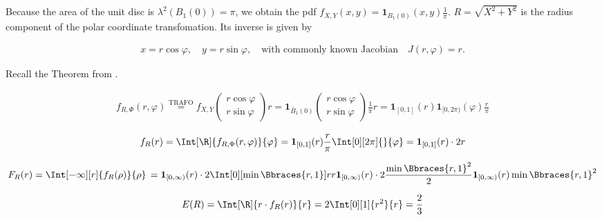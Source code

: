 \begin{solution}

Because the area of the unit disc is $\lambda^2(B_1(0)) = \pi$, we obtain the pdf $f_{X, Y}(x, y) = \mathbf 1_{B_1(0)}(x, y) \frac{1}{\pi}$.
$R = \sqrt{X^2 + Y^2}$ is the radius component of the polar coordinate transfomation.
Its inverse is given by

\begin{align*}
    x = r \cos \varphi,
    \quad
    y = r \sin \varphi,
    \quad
    \text{with commonly known Jacobian}
    \quad
    J(r, \varphi) = r.
\end{align*}

Recall the Theorem from \cite[Lecture 3, Slide 32]{EStat}.

\begin{align*}
    f_{R, \Phi}(r, \varphi)
    \stackrel
    {
        \text{TRAFO}
    }{=}
    f_{X, Y}
    \begin{pmatrix}
        r \cos \varphi \\
        r \sin \varphi
    \end{pmatrix}
    r
    =
    \mathbf 1_{\overline B_1(0)}
    \begin{pmatrix}
        r \cos \varphi \\
        r \sin \varphi
    \end{pmatrix}
    \frac{1}{\pi}
    r
    =
    \mathbf 1_{[0, 1]}(r)
    \mathbf 1_{[0, 2 \pi)}(\varphi)
    \frac{r}{\pi}
\end{align*}

\begin{align*}
    f_R(r)
    =
    \Int[\R]{f_{R, \Phi}(r, \varphi)}{\varphi}
    =
    \mathbf 1_{[0, 1]}(r) \frac{r}{\pi} \Int[0][2 \pi]{}{\varphi}
    =
    \mathbf 1_{[0, 1]}(r) \cdot 2 r
\end{align*}

\begin{align*}
    F_R(r)
    =
    \Int[-\infty][r]{f_R(\rho)}{\rho} \,
    =
    \mathbf 1_{[0, \infty)}(r) \cdot 2 \Int[0][\min \Bbraces{r, 1}]{r}{r}
    \mathbf 1_{[0, \infty)}(r) \cdot 2 \frac{\min \Bbraces{r, 1}^2}{2}
    \mathbf 1_{[0, \infty)}(r) \min \Bbraces{r, 1}^2
\end{align*}

\begin{align*}
    E(R)
    =
    \Int[\R]{r \cdot f_R(r)}{r}
    =
    2 \Int[0][1]{r^2}{r}
    =
    \frac{2}{3}
\end{align*}

\end{solution}

